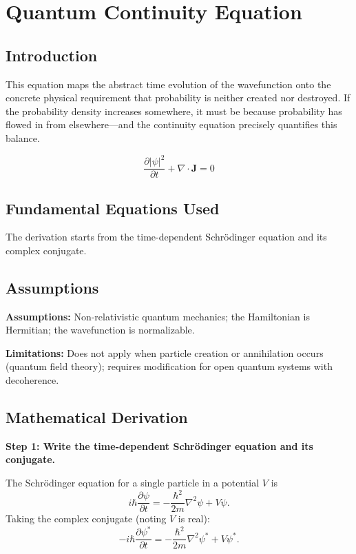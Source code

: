 \chapter{Quantum Continuity Equation}

\section*{Introduction}

This equation maps the abstract time evolution of the wavefunction onto the concrete physical requirement that probability is neither created nor destroyed. If the probability density increases somewhere, it must be because probability has flowed in from elsewhere---and the continuity equation precisely quantifies this balance.


\begin{equation}
\frac{\partial |\psi|^2}{\partial t} + \nabla \cdot \mathbf{J} = 0
\end{equation}

\section*{Fundamental Equations Used}

The derivation starts from the time-dependent Schr\"odinger equation and its complex conjugate.

\section*{Assumptions}

\textbf{Assumptions:} Non-relativistic quantum mechanics; the Hamiltonian is Hermitian; the wavefunction is normalizable.


\textbf{Limitations:} Does not apply when particle creation or annihilation occurs (quantum field theory); requires modification for open quantum systems with decoherence.


\section*{Mathematical Derivation}

\textbf{Step 1: Write the time-dependent Schr\"{o}dinger equation and its conjugate.}

The Schr\"{o}dinger equation for a single particle in a potential $V$ is
\begin{equation}
i\hbar\frac{\partial\psi}{\partial t} = -\frac{\hbar^2}{2m}\nabla^2\psi + V\psi.
\end{equation}
Taking the complex conjugate (noting $V$ is real):
\begin{equation}
-i\hbar\frac{\partial\psi^*}{\partial t} = -\frac{\hbar^2}{2m}\nabla^2\psi^* + V\psi^*.
\end{equation}

